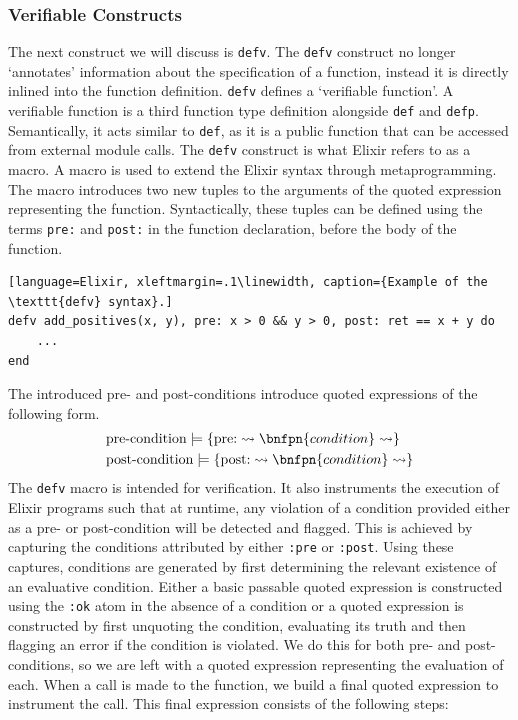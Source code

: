 \subsubsection{Verifiable Constructs}
The next construct we will discuss is \texttt{defv}. The \texttt{defv} construct no longer `annotates' information about the specification of a function, instead it is directly inlined into the function definition. \texttt{defv} defines a `verifiable function'. A verifiable function is a third function type definition alongside \texttt{def} and \texttt{defp}. Semantically, it acts similar to \texttt{def}, as it is a public function that can be accessed from external module calls. The \texttt{defv} construct is what Elixir refers to as a macro. A macro is used to extend the Elixir syntax through metaprogramming. The macro introduces two new tuples to the arguments of the quoted expression representing the function. Syntactically, these tuples can be defined using the terms \texttt{pre:} and \texttt{post:} in the function declaration, before the body of the function.
\begin{lstlisting}[language=Elixir, xleftmargin=.1\linewidth, caption={Example of the \texttt{defv} syntax}.]
defv add_positives(x, y), pre: x > 0 && y > 0, post: ret == x + y do
    ...
end
\end{lstlisting}
The introduced pre- and post-conditions introduce quoted expressions of the following form.
\[
\begin{aligned}
& \text{pre-condition} \models \{\text{pre:} \rightsquigarrow \bnfpn{condition} \rightsquigarrow \} \\
& \text{post-condition} \models \{\text{post:} \rightsquigarrow \bnfpn{condition} \rightsquigarrow \}
\end{aligned}
\]
The \texttt{defv} macro is intended for verification. It also instruments the execution of Elixir programs such that at runtime, any violation of a condition provided either as a pre- or post-condition will be detected and flagged. This is achieved by capturing the conditions attributed by either \texttt{:pre} or \texttt{:post}. Using these captures, conditions are generated by first determining the relevant existence of an evaluative condition. Either a basic passable quoted expression is constructed using the \texttt{:ok} atom in the absence of a condition or a quoted expression is constructed by first unquoting the condition, evaluating its truth and then flagging an error if the condition is violated. We do this for both pre- and post-conditions, so we are left with a quoted expression representing the evaluation of each. When a call is made to the function, we build a final quoted expression to instrument the call. This final expression consists of the following steps:
